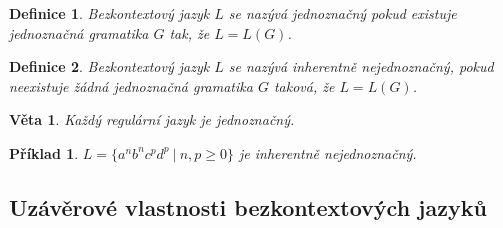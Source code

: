 \documentclass[10pt,a4paper]{article}
\theoremstyle{note}
\newtheorem{veta}{Věta}
\newtheorem{definice}{Definice}
\newtheorem{priklad}{Příklad}
\begin{document}
\begin{definice}
Bezkontextový jazyk $L$ se nazývá jednoznačný pokud existuje jednoznačná gramatika $G$ tak, že $L=L(G)$.
\end{definice}

\begin{definice}
Bezkontextový jazyk $L$ se nazývá \textit{inherentně} nejednoznačný, pokud neexistuje žádná jednoznačná gramatika $G$ taková, že $L=L(G)$.
\end{definice}

\begin{veta}
Každý regulární jazyk je jednoznačný.
\end{veta}





\begin{priklad}
$L=\lbrace a^nb^nc^pd^p\ |\ n,p\ge 0\rbrace$ je inherentně nejednoznačný.
\end{priklad}

\subsection{Uzávěrové vlastnosti bezkontextových jazyků}
\end{document}
